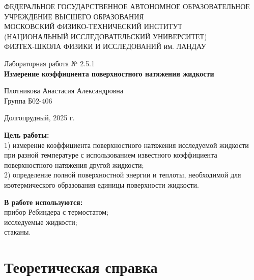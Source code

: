 \documentclass[a4paper,12pt]{article} %
\begin{document}
\begin{center}
	\footnotesize{ФЕДЕРАЛЬНОЕ ГОСУДАРСТВЕННОЕ АВТОНОМНОЕ ОБРАЗОВАТЕЛЬНОЕ 			УЧРЕЖДЕНИЕ ВЫСШЕГО ОБРАЗОВАНИЯ}\\
	\footnotesize{МОСКОВСКИЙ ФИЗИКО-ТЕХНИЧЕСКИЙ ИНСТИТУТ\\(НАЦИОНАЛЬНЫЙ 			ИССЛЕДОВАТЕЛЬСКИЙ УНИВЕРСИТЕТ)}\\
	\footnotesize{ФИЗТЕХ-ШКОЛА ФИЗИКИ И ИССЛЕДОВАНИЙ им. ЛАНДАУ\\}
	\hfill \break
	\hfill \break
	\hfill \break
	\hfill \break
\end{center}

\begin{center}   
    \hfill \break
	\hfill \break
	\hfill \break
	\hfill \break    \hfill \break
	\hfill \break
	\hfill \break
	\hfill \break
    \hfill \break
    \hfill \break
	\hfill \break
	\large{Лабораторная работа № 2.5.1 \\\textbf{Измерение коэффициента поверхностного натяжения
  жидкости}}\\
	\begin{flushright}
		Плотникова Анастасия Александровна\\
		Группа Б02-406
	\end{flushright}
	\hfill \break
	\hfill \break
	\hfill \break
\end{center}
\hfill \break
\hfill \break
\hfill \break
\hfill \break
\hfill \break
\hfill \break
\hfill \break
\hfill \break
\hfill \break
\hfill \break
\hfill \break
\hfill \break
\hfill \break
\begin{center}
	Долгопрудный, 2025 г.
\end{center}
\thispagestyle{empty}
\newpage
	\textbf{Цель работы:}\\ 
  1) измерение коэффициента поверхностного натяжения исследуемой жидкости при разной температуре с использованием известного коэффициента поверхностного натяжения другой жидкости; \\
  2) определение полной поверхностной энергии и теплоты, необходимой для изотермического образования единицы поверхности жидкости.
	\hfill \break
	
	\textbf{В работе используются:}\\ 
  прибор Ребиндера с термостатом; \\
  исследуемые жидкости; \\
  стаканы.
	
\section*{Теоретическая справка}
\end{document}
